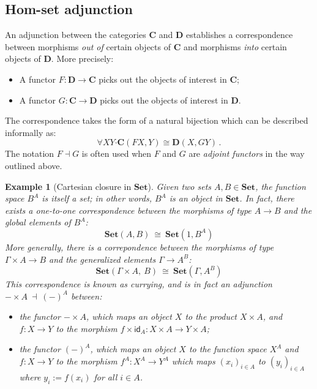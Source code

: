 \documentclass[11pt,oneside,draft]{book}
\newtheorem{example}[theorem]{Example}
\theoremstyle{definition}
\newcommand{\kw}[1]{\ensuremath{ \mathsf{#1} }}
\newcommand{\bdot}{\boldsymbol{\cdot}}
\begin{document}

\subsection{Hom-set adjunction} %

An adjunction between the categories $\mathbf{C}$ and $\mathbf{D}$
establishes a correspondence between
morphisms \emph{out of} certain objects of $\mathbf{C}$ and
morphisms \emph{into} certain objects of $\mathbf{D}$.
More precisely:
\begin{itemize}
  \item
    A functor $F : \mathbf{D} \rightarrow \mathbf{C}$
    picks out the objects of interest in $\mathbf{C}$;
  \item
    A functor $G : \mathbf{C} \rightarrow \mathbf{D}$
    picks out the objects of interest in $\mathbf{D}$.
\end{itemize}
The correspondence takes the form of a natural bijection
which can be described informally as:
\[
  \forall X Y \bdot \mathbf{C}(F X, Y) \cong \mathbf{D}(X, G Y)
  \,.
\]
The notation $F \dashv G$ is often used
when $F$ and $G$ are \emph{adjoint functors}
in the way outlined above.


\begin{example}[Cartesian closure in $\mathbf{Set}$] \label{ex:ccset} %
Given two sets $A, B \in \mathbf{Set}$,
the function space $B^A$
is itself a set;
in other words, $B^A$ is an object in $\mathbf{Set}$.
In fact, there exists a one-to-one correspondence
between the morphisms of type $A \rightarrow B$
and the global elements of $B^A$:
\[
  \mathbf{Set}(A, B)
  \: \cong \:
  \mathbf{Set}(1, B^A)
\]
More generally,
there is a correpondence
between the morphisms of type
$\Gamma \times A \rightarrow B$
and the generalized elements
$\Gamma \rightarrow A^B$:
\[
  \mathbf{Set}(\Gamma \times A, \: B)
  \: \cong \:
  \mathbf{Set}(\Gamma, A^B)
\]
This correspondence is known as \emph{currying},
and is in fact
an adjunction
$
  - \times A \: \dashv \: (-)^A
$
between:
\begin{itemize}
  \item the functor ${-} \times A$,
    which maps an object $X$ to the product $X \times A$,
    and $f : X \rightarrow Y$ to the morphism
    $f \times \kw{id}_A : X \times A \rightarrow Y \times A$;
  \item the functor $(-)^A$,
    which maps an object $X$ to the function space $X^A$
    and $f : X \rightarrow Y$ to the morphism
    $f^A : X^A \rightarrow Y^A$
    which maps $(x_i)_{i \in A}$
    to $(y_i)_{i \in A}$
    where $y_i := f(x_i)$ for all $i \in A$.
\end{itemize}
\end{example}
\end{document}
